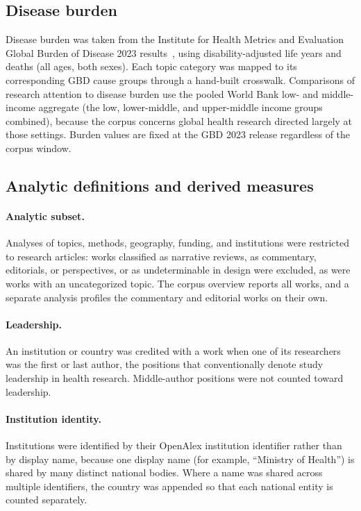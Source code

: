\subsection{Disease burden}

Disease burden was taken from the Institute for Health Metrics and Evaluation
Global Burden of Disease 2023 results~\cite{gbd2023}, using
disability-adjusted life years and deaths (all ages, both sexes). Each topic
category was mapped to its corresponding GBD cause groups through a hand-built
crosswalk. Comparisons of research attention to disease burden use the pooled
World Bank low- and middle-income aggregate (the low, lower-middle, and
upper-middle income groups combined), because the corpus concerns global health
research directed largely at those settings. Burden values are fixed at the GBD
2023 release regardless of the corpus window.

\subsection{Analytic definitions and derived measures}

\paragraph{Analytic subset.}
Analyses of topics, methods, geography, funding, and institutions were
restricted to research articles: works classified as narrative reviews, as
commentary, editorials, or perspectives, or as undeterminable in design were
excluded, as were works with an uncategorized topic. The corpus overview
reports all works, and a separate analysis profiles the commentary and
editorial works on their own.

\paragraph{Leadership.}
An institution or country was credited with a work when one of its researchers
was the first or last author, the positions that conventionally denote study
leadership in health research. Middle-author positions were not counted toward
leadership.

\paragraph{Institution identity.}
Institutions were identified by their OpenAlex institution identifier rather
than by display name, because one display name (for example, ``Ministry of
Health'') is shared by many distinct national bodies. Where a name was shared
across multiple identifiers, the country was appended so that each national
entity is counted separately.

